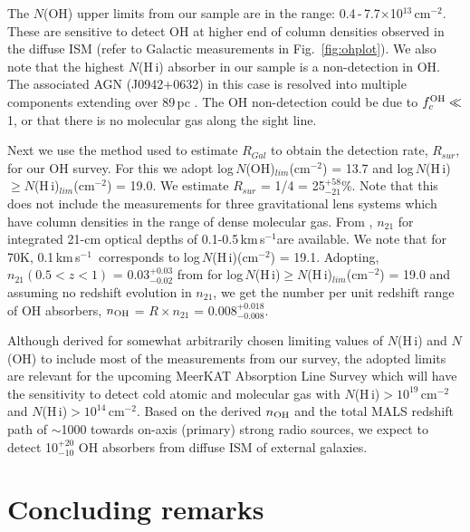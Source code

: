 \documentclass[iop,apjl,numberedappendix,appendixfloats,twocolappendix,revtex4]{emulateapj}
\newcommand{\hi}{\mbox{H\,{\sc i}}}
\newcommand{\kms}{km\,s$^{-1}$}
\newcommand{\cmsq}{cm$^{-2}$}
\begin{document}
The $N$(OH) upper limits from our sample are in the range: 0.4\,-\,7.7$\times$10$^{13}$\,\cmsq.  These are sensitive to detect OH 
at higher end of column densities observed in the diffuse ISM (refer to Galactic measurements in Fig.~\ref{fig:ohplot}). 
We also note that the highest $N$(\hi) absorber in our sample is a non-detection in OH. The associated 
AGN (J0942+0632) in this case is resolved into multiple components extending over 89\,pc \citep[][]{Srianand15}.  The OH non-detection could be due 
to $f_c^{\rm OH} \ll$1, or that there is no molecular gas along the sight line.        

Next we use the method used to estimate $R_{Gal}$ to obtain the detection rate, $R_{sur}$,  for our OH survey.
For this we adopt log\,$N$({\rm OH})$_{lim}$(\cmsq) = 13.7 and log\,$N$(\hi)$\ge$$N$(\hi)$_{lim}$(\cmsq) = 19.0.
We estimate $R_{sur}$ = 1/4 = 25$^{+58}_{-21}$\%.  Note that this does not include the measurements for three gravitational 
lens systems which have column densities in the range of dense molecular gas. 
From \citet[][]{Gupta12}, $n_{21}$ for integrated 21-cm optical depths of 0.1-0.5\,\kms are available. We note that for 70K, 0.1\,\kms\ corresponds 
to log\,$N$(\hi)(\cmsq) = 19.1.
%
Adopting, $n_{21}(0.5<z<1)$ = 0.03$^{+0.03}_{-0.02}$ from \citet[][]{Gupta12} for log\,$N$(\hi)$\ge$$N$(\hi)$_{lim}$(\cmsq) = 19.0 and assuming no redshift evolution in $n_{21}$, 
we get the number per unit redshift range of OH absorbers, $n_{\rm OH}$ = $R\times n_{21}$ = $0.008^{+0.018}_{-0.008}$. 

Although derived for somewhat arbitrarily chosen limiting values of $N$(\hi) and $N$(OH)  to include most of the measurements from our survey, 
the adopted limits are relevant for the upcoming MeerKAT Absorption Line Survey \citep[MALS;][]{Gupta17mals} which will have the sensitivity to detect 
cold atomic and molecular gas with $N$(\hi)$>10^{19}$\,\cmsq and $N$(\hi)$>10^{14}$\,\cmsq. 
Based on the derived $n_{\rm OH}$ and the total MALS redshift path of $\sim$1000 towards on-axis (primary) strong radio sources, we expect to 
detect 10$^{+20}_{-10}$ OH absorbers from diffuse ISM of external galaxies.


\section{Concluding remarks}    
\label{sec:conc}  
\end{document}

